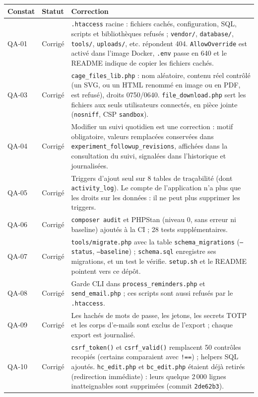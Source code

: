 \documentclass[11pt,a4paper]{article}
\newcommand{\f}[1]{\nolinkurl{#1}}
\begin{document}
\begin{center}
\begin{tabularx}{\textwidth}{@{}lp{2.1cm}X@{}}
\toprule
\textbf{Constat} & \textbf{Statut} & \textbf{Correction}\\
\midrule
QA-01 & \textcolor{ok}{Corrigé} & \f{.htaccess} racine : fichiers cachés, configuration, SQL, scripts et bibliothèques refusés ; \f{vendor/}, \f{database/}, \f{tools/}, \f{uploads/}, etc. répondent 404. \f{AllowOverride} est activé dans l'image Docker, \f{.env} passe en 640 et le README indique de copier les fichiers cachés.\\
QA-03 & \textcolor{ok}{Corrigé} & \f{cage_files_lib.php} : nom aléatoire, contenu réel contrôlé (un SVG, ou un HTML renommé en image ou en PDF, est refusé), droits 0750/0640. \f{file_download.php} sert les fichiers aux seuls utilisateurs connectés, en pièce jointe (\texttt{nosniff}, CSP \texttt{sandbox}).\\
QA-04 & \textcolor{ok}{Corrigé} & Modifier un suivi quotidien est une correction : motif obligatoire, valeurs remplacées conservées dans \f{experiment_followup_revisions}, affichées dans la consultation du suivi, signalées dans l'historique et journalisées.\\
QA-05 & \textcolor{ok}{Corrigé} & Triggers d'ajout seul sur 8 tables de traçabilité (dont \f{activity_log}). Le compte de l'application n'a plus que les droits sur les données : il ne peut plus supprimer les triggers.\\
QA-06 & \textcolor{ok}{Corrigé} & \texttt{composer audit} et PHPStan (niveau 0, sans erreur ni baseline) ajoutés à la CI ; 28 tests supplémentaires.\\
QA-07 & \textcolor{ok}{Corrigé} & \f{tools/migrate.php} avec la table \f{schema_migrations} (\texttt{--status}, \texttt{--baseline}) ; \f{schema.sql} enregistre ses migrations, et un test le vérifie. \f{setup.sh} et le README pointent vers ce dépôt.\\
QA-08 & \textcolor{ok}{Corrigé} & Garde CLI dans \f{process_reminders.php} et \f{send_email.php} ; ces scripts sont aussi refusés par le \f{.htaccess}.\\
QA-09 & \textcolor{ok}{Corrigé} & Les hachés de mots de passe, les jetons, les secrets TOTP et les corps d'e-mails sont exclus de l'export ; chaque export est journalisé.\\
QA-10 & \textcolor{ok}{Corrigé} & \f{csrf_token()} et \f{csrf_valid()} remplacent 50 contrôles recopiés (certains comparaient avec \texttt{!==}) ; helpers SQL ajoutés. \f{hc_edit.php} et \f{bc_edit.php} étaient déjà retirés (redirection immédiate) : leurs quelque 2\,000 lignes inatteignables sont supprimées (commit \f{2de62b3}).\\

\end{tabularx}
\end{center}
\end{document}
